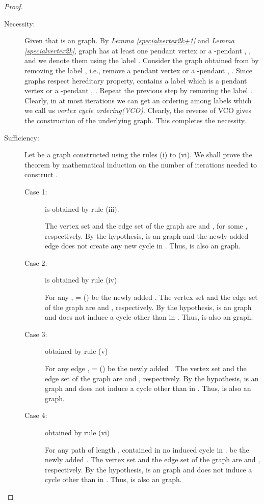 \documentclass[runningheads]{llncs}
\begin{document}
\begin{proof}
\begin{description}

\item[{Necessity:}] Given that  is an  graph. By \emph{Lemma \ref{specialvertex2k+1}} and \emph{Lemma \ref{specialvertex2k}},  graph has at least one pendant vertex or a -pendant , , and we denote them using the label . Consider the graph  obtained from  by removing the label , i.e., remove a pendant vertex or a -pendant , . Since  graphs respect hereditary property,  contains a label  which is a pendant vertex or a -pendant , . Repeat the previous step by removing the label . Clearly, in at most  iterations we can get an ordering among labels which we call us \emph{vertex cycle ordering(VCO)}. Clearly, the reverse of VCO gives the construction of the underlying  graph. This completes the necessity.
\item[{Sufficiency:}] Let  be a graph constructed using the rules (i) to (vi). We shall prove the theorem by mathematical induction on the number of iterations needed to construct .
\begin{description}
\item[Case 1:]  is obtained by rule (iii).
 
The vertex set and the edge set of the graph  are  and , for some , respectively. By the hypothesis,  is an  graph and the newly added edge  does not create any new cycle in . Thus,  is also an  graph.

\item[Case 2:]  is obtained by rule (iv)

For any ,  = () be the newly added . The vertex set and the edge set of the graph  are  and , respectively. By the hypothesis,  is an  graph and  does not induce a cycle other than  in . Thus,  is also an  graph.

\item[Case 3:]  obtained by rule (v)

For any edge ,  = () be the newly added . The vertex set and the edge set of the graph  are  and , respectively. By the hypothesis,  is an  graph and  does not induce a cycle other than  in . Thus,  is also an  graph.


\item[Case 4:]  obtained by rule (vi)


For any path of length ,  contained in no induced cycle in .  be the newly added . The vertex set and the edge set of the graph  are  and , respectively. By the hypothesis,  is an  graph and  does not induce a cycle other than  in . Thus,  is also an  graph. 




\end{description}
\end{description}
\end{proof}
\end{document}
